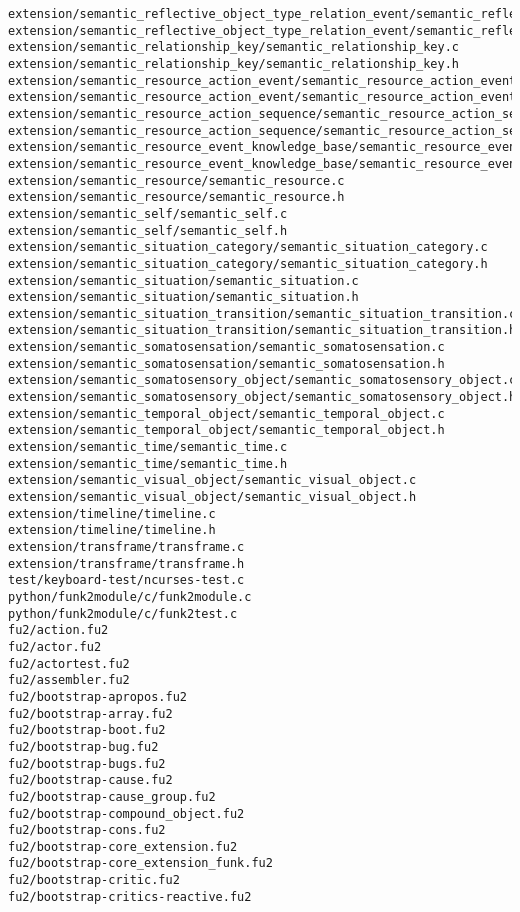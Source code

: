 \begin{lstlisting}
extension/semantic_reflective_object_type_relation_event/semantic_reflective_object_type_relation_event.c
extension/semantic_reflective_object_type_relation_event/semantic_reflective_object_type_relation_event.h
extension/semantic_relationship_key/semantic_relationship_key.c
extension/semantic_relationship_key/semantic_relationship_key.h
extension/semantic_resource_action_event/semantic_resource_action_event.c
extension/semantic_resource_action_event/semantic_resource_action_event.h
extension/semantic_resource_action_sequence/semantic_resource_action_sequence.c
extension/semantic_resource_action_sequence/semantic_resource_action_sequence.h
extension/semantic_resource_event_knowledge_base/semantic_resource_event_knowledge_base.c
extension/semantic_resource_event_knowledge_base/semantic_resource_event_knowledge_base.h
extension/semantic_resource/semantic_resource.c
extension/semantic_resource/semantic_resource.h
extension/semantic_self/semantic_self.c
extension/semantic_self/semantic_self.h
extension/semantic_situation_category/semantic_situation_category.c
extension/semantic_situation_category/semantic_situation_category.h
extension/semantic_situation/semantic_situation.c
extension/semantic_situation/semantic_situation.h
extension/semantic_situation_transition/semantic_situation_transition.c
extension/semantic_situation_transition/semantic_situation_transition.h
extension/semantic_somatosensation/semantic_somatosensation.c
extension/semantic_somatosensation/semantic_somatosensation.h
extension/semantic_somatosensory_object/semantic_somatosensory_object.c
extension/semantic_somatosensory_object/semantic_somatosensory_object.h
extension/semantic_temporal_object/semantic_temporal_object.c
extension/semantic_temporal_object/semantic_temporal_object.h
extension/semantic_time/semantic_time.c
extension/semantic_time/semantic_time.h
extension/semantic_visual_object/semantic_visual_object.c
extension/semantic_visual_object/semantic_visual_object.h
extension/timeline/timeline.c
extension/timeline/timeline.h
extension/transframe/transframe.c
extension/transframe/transframe.h
test/keyboard-test/ncurses-test.c
python/funk2module/c/funk2module.c
python/funk2module/c/funk2test.c
fu2/action.fu2
fu2/actor.fu2
fu2/actortest.fu2
fu2/assembler.fu2
fu2/bootstrap-apropos.fu2
fu2/bootstrap-array.fu2
fu2/bootstrap-boot.fu2
fu2/bootstrap-bug.fu2
fu2/bootstrap-bugs.fu2
fu2/bootstrap-cause.fu2
fu2/bootstrap-cause_group.fu2
fu2/bootstrap-compound_object.fu2
fu2/bootstrap-cons.fu2
fu2/bootstrap-core_extension.fu2
fu2/bootstrap-core_extension_funk.fu2
fu2/bootstrap-critic.fu2
fu2/bootstrap-critics-reactive.fu2

\end{lstlisting}

